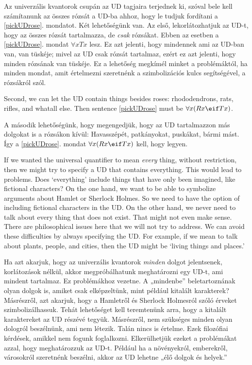 Az univerzális kvantorok csupán az UD tagjaira terjednek ki, szóval bele kell számítanunk az összes rózsát a UD-ba ahhoz, hogy le tudjuk fordítani a \ref{pickUDrose}. mondatot. Két lehetőségünk van. Az első, lekorlátozhatjuk az UD-t, hogy az összes rózsát tartalmazza, de \emph{csak} rózsákat. Ebben az esetben a \ref{pickUDrose}. mondat $\forall x Tx$ lesz. Ez azt jelenti, hogy mindennek ami az UD-ban van, van tüskéje; mivel az UD csak rózsát tartalmaz, ezért ez azt jelenti, hogy minden rózsának van tüskéje. Ez a lehetőség megkímél minket a problémáktól, ha minden mondat, amit értelmezni szeretnénk a szimbolizációs kulcs segítségével, a rózsákról szól.

Second, we can let the UD contain things besides roses: rhododendrons, rats, rifles, and whatall else. Then sentence \ref{pickUDrose} must be $\forall x(Rx \eif Tx)$.

A második lehetőségünk, hogy megengedjük, hogy az UD tartalmazzon más dolgokat is a rózsákon kívül: Havasszépét, patkányokat, puskákat, bármi mást. Így a \ref{pickUDrose}. mondat $\forall x(Rx \eif Tx)$ kell, hogy legyen.

If we wanted the universal quantifier to mean \emph{every} thing, without restriction, then we might try to specify a UD that contains everything. This would lead to problems. Does `everything' include things that have only been imagined, like fictional characters? On the one hand, we want to be able to symbolize arguments about Hamlet or Sherlock Holmes. So we need to have the option of including fictional characters in the UD. On the other hand, we never need to talk about every thing that does not exist. That might not even make sense. There are philosophical issues here that we will not try to address. We can avoid these difficulties by always specifying the UD. For example, if we mean to talk about plants, people, and cities, then the UD might be `living things and places.'

Ha azt akarjuk, hogy az univerzális kvantorok \emph{minden} dolgot jelentsenek, korlátozások nélkül, akkor megpróbálhatunk meghatározni egy UD-t, ami mindent tartalmaz. Ez problémákhoz vezetne. A „mindenbe” beletartoznának olyan dolgok is, amiket csak elképzeltünk, mint például kitalált karakterek? Másrészről, azt akarjuk, hogy a Hamletről és Sherlock Holmesról szóló érveket szimbolizálhassuk. Tehát lehetőséget kell teremtenünk arra, hogy a kitalált karaktereket az UD részévé tegyük. Másrészről, nem szükséges minden olyan dologról beszélnünk, ami nem létezik. Talán nincs is értelme. Ezek filozófiai kérdések, amikkel nem fogunk foglalkozni. Elkerülhetjük ezeket a problémákat azzal, hogy meghatározzuk az UD-t. Például ha a növényekról, emberekről, városokról szeretnénk beszélni, akkor az UD lehetne „élő dolgok és helyek.”

